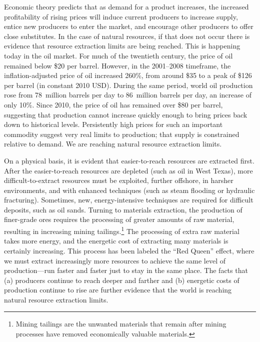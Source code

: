 Economic theory predicts that as demand for a product increases,
the increased profitability of rising prices 
will induce current producers to increase supply, 
entice new producers to enter the market,
and encourage other producers to offer close substitutes. 
In the case of natural resources, if that does not occur
there is evidence that resource extraction limits are being reached.
This is happening today in the oil market.
For much of the twentieth century, the price of oil remained below \$20 per barrel.
However, in the 2001--2008 timeframe,
the inflation-adjusted price of oil increased 260\%,
from around \$35 to a peak of \$126 per barrel 
(in constant 2010 USD).
During the same period,
world oil production rose from 
78~million barrels per day to 86~million barrels per day,
an increase of only 10\%.\cite{EIA2014}
Since 2010, the price of oil has remained over \$80 per barrel,
suggesting that production cannot increase quickly enough to bring prices
back down to historical levels.
Persistently high prices for such an important commodity
suggest very real limits to production; 
that supply is constrained relative to demand. 
We are reaching natural resource extraction limits.

On a physical basis, 
it is evident that easier-to-reach resources are extracted first. 
After the easier-to-reach resources are depleted (such as oil in West Texas),
more difficult-to-extract resources must be exploited,
further offshore,
in harsher environments, and
with enhanced techniques 
(such as steam flooding or hydraulic fracturing).
Sometimes, new, energy-intensive techniques are required 
for difficult deposits, such as oil sands.
Turning to materials extraction, the production of finer-grade ores
requires the processing of greater amounts of raw material, 
resulting in increasing mining tailings.\footnote{Mining tailings
	are the unwanted materials that remain after mining processes
	have removed economically valuable materials.\cite{Mudd2007}
	}
The processing of extra raw material takes more energy, and 
the energetic cost of extracting many materials is certainly increasing.\cite{Hall1986, Mudd2010, Hall2011}
This process has been labeled the ``Red Queen'' effect, 
where we must extract increasingly more resources to achieve the same
level of production---run faster and faster just to stay in 
the same place.\cite{Lees1975, Ross1988, Murray2013, Murphy2014}
The facts that (a) producers continue to reach deeper and farther 
and (b) energetic costs of production continue to rise
are further evidence that the world is reaching natural resource extraction limits.


